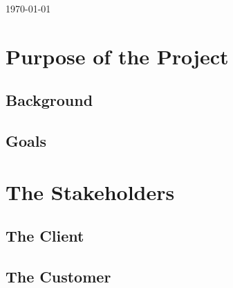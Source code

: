 \documentclass[paper=letter, fontsize=10pt]{scrartcl}
\numberwithin{equation}{section}		%
\numberwithin{figure}{section}			%
\numberwithin{table}{section}				%
\begin{document}
\begin{titlepage}
\begin{center}


{\large \today}\\[3cm] %


 

\vfill %
\end{center}
\end{titlepage}

\setcounter{tocdepth}{2}

\tableofcontents

\newpage

\section{Purpose of the Project}
\subsection{Background}
\subsection{Goals}

\section{The Stakeholders}
\subsection{The Client}
\subsection{The Customer}
\end{document}
